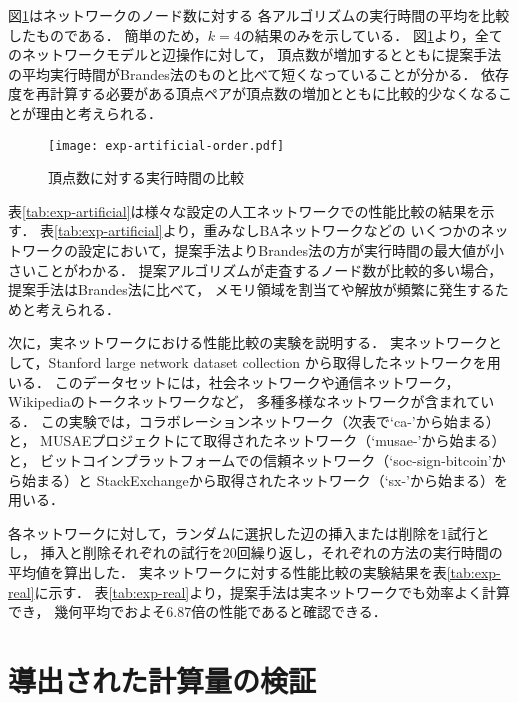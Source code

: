 図\ref{fig:exp-artificial-order}はネットワークのノード数に対する
各アルゴリズムの実行時間の平均を比較したものである．
簡単のため，$k=4$の結果のみを示している．
図\ref{fig:exp-artificial-order}より，全てのネットワークモデルと辺操作に対して，
頂点数が増加するとともに提案手法の平均実行時間がBrandes法のものと比べて短くなっていることが分かる．
依存度を再計算する必要がある頂点ペアが頂点数の増加とともに比較的少なくなることが理由と考えられる．

\begin{figure}[tb]
  \centering
  \texttt{[image: exp-artificial-order.pdf]}
  \caption{頂点数に対する実行時間の比較}
  \label{fig:exp-artificial-order}
\end{figure}

表\ref{tab:exp-artificial}は様々な設定の人工ネットワークでの性能比較の結果を示す．
表\ref{tab:exp-artificial}より，重みなしBAネットワークなどの
いくつかのネットワークの設定において，提案手法よりBrandes法の方が実行時間の最大値が小さいことがわかる．
提案アルゴリズムが走査するノード数が比較的多い場合，提案手法はBrandes法に比べて，
メモリ領域を割当てや解放が頻繁に発生するためと考えられる．



次に，実ネットワークにおける性能比較の実験を説明する．
実ネットワークとして，Stanford large network dataset collection\cite{Leskovec2016}
から取得したネットワークを用いる．
このデータセットには，社会ネットワークや通信ネットワーク，Wikipediaのトークネットワークなど，
多種多様なネットワークが含まれている．
この実験では，コラボレーションネットワーク（次表で`ca-'から始まる）と，
MUSAEプロジェクト\cite{Rozemberczki2019b}にて取得されたネットワーク（`musae-'から始まる）と，
ビットコインプラットフォームでの信頼ネットワーク（`soc-sign-bitcoin'から始まる）と
StackExchangeから取得されたネットワーク（`sx-'から始まる）を用いる．

各ネットワークに対して，ランダムに選択した辺の挿入または削除を$1$試行とし，
挿入と削除それぞれの試行を$20$回繰り返し，それぞれの方法の実行時間の平均値を算出した．
実ネットワークに対する性能比較の実験結果を表\ref{tab:exp-real}に示す．
表\ref{tab:exp-real}より，提案手法は実ネットワークでも効率よく計算でき，
幾何平均でおよそ$6.87$倍の性能であると確認できる．



\section{導出された計算量の検証}

